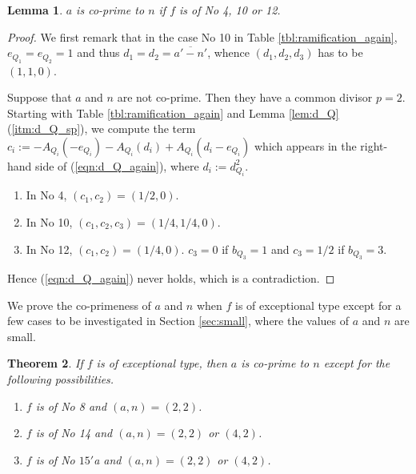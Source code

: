 \documentclass[a4paper,11pt]{amsart}
\newtheorem{theorem}{Theorem}[section]
\newtheorem{lemma}[theorem]{Lemma}
\theoremstyle{definition}
\theoremstyle{remark}
\numberwithin{equation}{section}
\begin{document}
\begin{lemma}\label{lem:co-prime_4,10,12,15-2}
$a$ is co-prime to $n$
if $f$ is of No 4, 10 or 12.
\end{lemma}

\begin{proof}
We first remark that in the case No 10 in Table \ref{tbl:ramification_again},
$e_{Q_1}=e_{Q_2}=1$ and thus $d_1=d_2=\overline{a'-n'}$,
whence $(d_1,d_2,d_3)$ has to be $(1,1,0)$.

Suppose that $a$ and $n$ are not co-prime.
Then they have a common divisor $p=2$.
Starting with Table \ref{tbl:ramification_again} and
Lemma \ref{lem:d_Q}(\ref{itm:d_Q_sp}),
we compute the term $c_i:=-A_{Q_i}(-e_{Q_i})-A_{Q_i}(d_i)+A_{Q_i}(d_i-e_{Q_i})$
which appears in the right-hand side of (\ref{eqn:d_Q_again}),
where $d_i:=d_{Q_i}^2$.
\begin{enumerate}
\item
In No 4, $(c_1,c_2)=(1/2,0)$.
\item
In No 10, $(c_1,c_2,c_3)=(1/4,1/4,0)$.
\item
In No 12, $(c_1,c_2)=(1/4,0)$.
$c_3=0$ if $b_{Q_3}=1$ and $c_3=1/2$ if $b_{Q_3}=3$.
\end{enumerate}
Hence (\ref{eqn:d_Q_again}) never holds,
which is a contradiction.
\end{proof}

We prove the co-primeness of $a$ and $n$ when $f$ is of exceptional type
except for a few cases to be investigated in Section \ref{sec:small},
where the values of $a$ and $n$ are small.

\begin{theorem}\label{thm:co-prime_almost}
If $f$ is of exceptional type,
then $a$ is co-prime to $n$ except for the following possibilities.
\begin{enumerate}
\item
$f$ is of No 8 and $(a,n)=(2,2)$.
\item
$f$ is of No 14 and $(a,n)=(2,2)$ or $(4,2)$.
\item
$f$ is of No $\textrm{15}'$a and
$(a,n)=(2,2)$ or $(4,2)$.
\end{enumerate}
\end{theorem}
\end{document}
